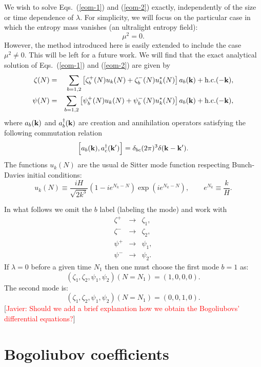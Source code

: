 \documentclass[
 aip,
 jmp,
 amsmath,amssymb,
 reprint,
 nofootinbib,
]{revtex4-2}
\def\bea{\begin{eqnarray}}
\def\eea{\end{eqnarray}}
\def\be{\begin{equation}}
\def\ee{\end{equation}}
\def\k{{\bf k}}
\begin{document}
We wish to solve Eqs.~(\ref{eom-1}) and (\ref{eom-2}) exactly, independently of the size or time dependence of $\lambda$. For simplicity, we will focus on the particular case in which the entropy mass vanishes (an ultralight entropy field):
\be
\mu^2 = 0 .
\ee
However, the method introduced here is easily extended to include the case $\mu^2 \neq 0$. This will be left for a future work. We will find that the exact analytical solution of Eqs.~(\ref{eom-1}) and (\ref{eom-2}) are given by
\bea
\zeta (N) &=& \sum_{b=1,2} \left[ \zeta_{b}^+ (N) u_k(N) + \zeta_{b}^{-}(N) u^*_k(N) \right] a_b (\k) + {\rm h.c.} (-{\bf k}) ,  \label{sol-intro-1} \\
\psi (N) &=& \sum_{b=1,2}  \left[ \psi_{b}^+(N) u_k(N) + \psi_{b}^-(N) u^*_k(N) \right] a_b (\k) + {\rm h.c.} (-{\bf k}) ,  \label{sol-intro-2}
\eea
where $a_b (\k)$ and $a_b^{\dag} (\k)$ are creation and annihilation operators satisfying the following commutation relation 
\be
\Big[ a_b (\k)   , a_c^{\dag} (\k') \Big] = \delta_{bc} (2 \pi)^3 \delta (\k - \k') . \label{cre-ann}
\ee
The functions $u_k(N)$ are the usual de Sitter mode function respecting Bunch-Davies initial conditions:
\be
u_k(N) \equiv   \frac{iH}{\sqrt{2 k^3}} \left(1 - i e^{N_k-N} \right) \exp \left( i  e^{N_k-N} \right) , \qquad e^{N_k} \equiv \frac{k}{H} . \label{BD-mode}
\ee

In what follows we omit the $b$ label (labeling the mode) and work with
\bea
\zeta^+ &\to& \zeta_1 ,\\
\zeta^- &\to& \zeta_2 ,\\
\psi^+ &\to& \psi_1 ,\\
\psi^- &\to& \psi_2 .
\eea
If $\lambda = 0$ before a given time $N_1$ then one must choose the first mode $b=1$ as:
\begin{equation}
    (\zeta_1, \zeta_2, \psi_1, \psi_2)(N=N_1) = (1,0,0,0).
\end{equation}
The second mode is:
\begin{equation}
    (\zeta_1, \zeta_2, \psi_1, \psi_2)(N=N_1) = (0,0,1,0).
\end{equation}
[\textcolor{red}{Javier: Should we add a brief explanation how we obtain the Bogoliubovs' differential equations?}]

\section{Bogoliubov coefficients}
\end{document}

